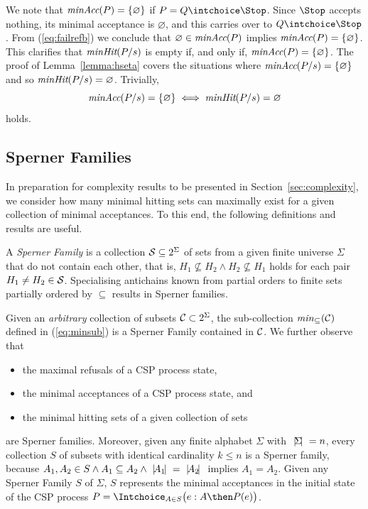 %
We note that $\text{\it minAcc}(P) = \{ \varnothing \}$ if $P = Q\intchoice \Stop$.
Since $\Stop$ accepts nothing, its minimal acceptance is $\varnothing$, and
this carries over to $Q\intchoice \Stop$.  From (\ref{eq:failrefb}) we
conclude that $\varnothing\in\text{\it minAcc}(P)$ implies $\text{\it minAcc}(P) = \{
\varnothing \}$. This clarifies that $\text{\it minHit}(P/s)$ is empty if, and only
if, $\text{\it minAcc}(P) = \{ \varnothing \}$. The proof of Lemma~\ref{lemma:hseta}
covers the situations where $\text{\it minAcc}(P/s) = \{ \varnothing \}$ and so
$\text{\it minHit}(P/s) = \varnothing$. Trivially,
\begin{equation}
\label{eq:minhitminaccempty}
\text{\it minAcc}(P/s) = \{ \varnothing \} \iff \text{\it minHit}(P/s) = \varnothing
\end{equation}
holds.



\subsection{Sperner Families}
\label{sec:sperner}

In preparation for complexity results to be presented in
Section~\ref{sec:complexity}, we consider how many minimal hitting sets can
maximally exist for a given collection of minimal acceptances. To this end,
the following definitions and results are useful.

A \emph{Sperner Family} is a collection ${\cal S} \subseteq 2^\Sigma$ of sets from a
given finite universe $\Sigma$ that do not contain each other, that is, $H_1
\not\subseteq H_2 \wedge H_2 \not\subseteq H_1$ holds for each pair $H_1\neq
H_2\in {\cal S}$. Specialising antichains known from partial orders to finite sets
partially ordered by $\subseteq$ results in Sperner families.

Given an {\it arbitrary} collection of subsets ${\cal C}\subset 2^\Sigma$,
the sub-collection ${\it min}_\subseteq({\cal C})$ defined in (\ref{eq:minsub})
is a Sperner Family contained
in ${\cal C}$.
We further observe that
\begin{itemize}
\item the maximal refusals of a CSP process state,
\item the minimal acceptances of a CSP process state, and
\item the minimal hitting sets of a given collection of sets
\end{itemize}
are Sperner families. Moreover, given any finite alphabet $\Sigma$ with
${~|\! \Sigma\!|~} = n$, every collection $S$ of subsets with identical
cardinality $k \le n$ is a Sperner family,  because $A_1, A_2\in S \wedge A_1
\subseteq A_2\wedge {~|\! A_1\!|~} = {~|\! A_2\!|~}$ implies $A_1 = A_2$. Given  any
Sperner Family $S$ of $\Sigma$, $S$ represents the minimal acceptances in the
initial state of the CSP process
$P = \Intchoice_{A\in S}\big( e:A \then P(e) \big)$.

